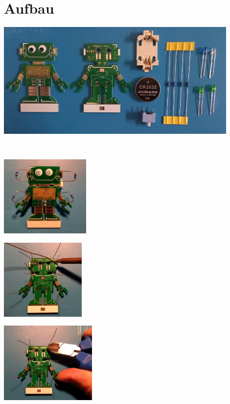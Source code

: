 \documentclass[a4paper]{article}
\begin{document}
\section{Aufbau}
\begin{minipage}[t]{\textwidth}
  \centering
  \includegraphics[width=0.9\textwidth]{../pictures/Parts.jpg}
  \label{img:Bauteile}
\end{minipage}
\ \\
\begin{minipage}[t]{0.33\textwidth}
  \centering
  \includegraphics[height=4cm]{../pictures/Resistor1.jpg}
  \label{img:Resistor1}
  \end{minipage}
\begin{minipage}[t]{0.33\textwidth}
  \centering
  \includegraphics[height=4cm]{../pictures/Resistor2.jpg}
  \label{img:Resistor2}
\end{minipage}
\begin{minipage}[t]{0.33\textwidth}
  \centering
  \includegraphics[height=4cm]{../pictures/Resistor3.jpg}
  \label{img:Resistor3}
\end{minipage}
\end{document}
